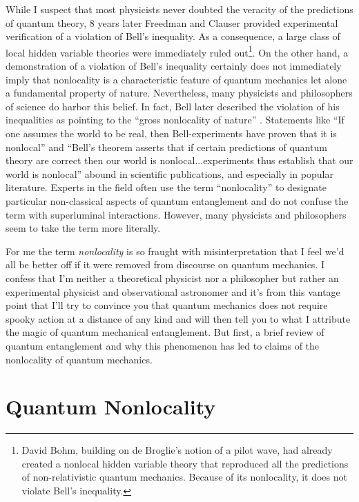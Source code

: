 \documentclass[12pt]{article}
\begin{document}
While I suspect that most physicists never doubted the veracity of the predictions of quantum theory, 8 years later Freedman and Clauser\cite{Fre72} provided experimental verification of a violation of Bell's inequality. As a consequence, a large class of local hidden variable theories were immediately ruled out\footnote{David Bohm, building on de Broglie's notion of a pilot wave, had already created a nonlocal hidden variable theory\cite{Boh52} that reproduced all the predictions of non-relativistic quantum mechanics. Because of its nonlocality, it does not violate Bell's inequality.}. On the other hand, a demonstration of a violation of Bell's inequality certainly does not immediately imply that nonlocality is a characteristic feature of quantum mechanics let alone a fundamental property of nature. Nevertheless, many physicists and philosophers of science do harbor this belief. In fact, Bell later described the violation of his inequalities as pointing to the ``gross nonlocality of nature'' \cite{Bel75}.  Statements like ``If one assumes the world to be real, then Bell-experiments have proven that it is nonlocal''\cite{Wis06} and ``Bell's theorem asserts that if certain predictions of quantum theory are correct then our world is nonlocal...experiments thus establish that our world is nonlocal''\cite{Gol11} abound in scientific publications, and especially in popular literature.  Experts in the field often use the term ``nonlocality'' to designate particular non-classical aspects of quantum entanglement and do not confuse the term with superluminal interactions. However, many physicists and philosophers seem to take the term more literally. 

For me the term {\it nonlocality} is so fraught with misinterpretation that I feel we'd all be better off if it were removed from discourse on quantum mechanics. I confess that I'm neither a theoretical physicist nor a philosopher but rather an experimental physicist and observational astronomer and it's from this vantage point that I'll try to convince you that quantum mechanics does not require spooky action at a distance of any kind and will then tell you to what I attribute the magic of quantum mechanical entanglement. But first, a brief review of quantum entanglement and why this phenomenon has led to claims of the nonlocality of quantum mechanics.

\section{Quantum Nonlocality}
\end{document}
